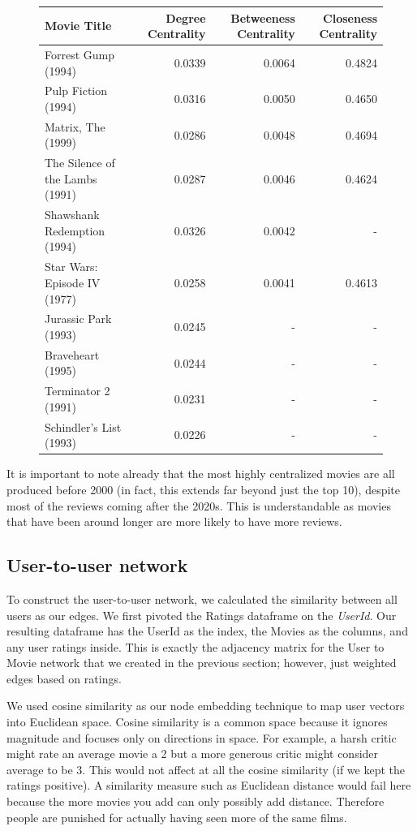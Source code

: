 \documentclass[12pt]{article}
\numberwithin{equation}{section}
\begin{document}
\begin{figure}[h!]
    \begin{tabular}{|p{6cm}|r|r|r|}
        \hline
        \textbf{Movie Title} & \multicolumn{1}{p{2.5cm}|}{\textbf{Degree Centrality}} & \multicolumn{1}{p{3cm}|}{\textbf{Betweeness Centrality}} & \multicolumn{1}{p{3cm}|}{\textbf{Closeness Centrality}} \\
        \hline
        Forrest Gump (1994) & 0.0339 & 0.0064 & 0.4824 \\
        Pulp Fiction (1994) & 0.0316 & 0.0050 & 0.4650 \\
        Matrix, The (1999) & 0.0286 & 0.0048 & 0.4694 \\
        The Silence of the Lambs (1991) & 0.0287 & 0.0046 & 0.4624 \\
        Shawshank Redemption (1994) & 0.0326 & 0.0042 & - \\
        Star Wars: Episode IV (1977) & 0.0258 & 0.0041 & 0.4613 \\
        Jurassic Park (1993) & 0.0245 & - & - \\
        Braveheart (1995) & 0.0244 & - & - \\
        Terminator 2 (1991) & 0.0231 & - & - \\
        Schindler's List (1993) & 0.0226 & - & - \\
        \hline
    \end{tabular}
\end{figure}

It is important to note already that the most highly centralized movies are all produced before 2000 (in fact, this extends far beyond just the top 10), despite most of the reviews coming after the 2020s. This is understandable as movies that have been around longer are more likely to have more reviews.

\subsection{User-to-user network}

To construct the user-to-user network, we calculated the similarity between all users as our edges.  We first pivoted the Ratings dataframe on the \textit{UserId}. Our resulting dataframe has the UserId as the index, the Movies as the columns, and any user ratings inside. This is exactly the adjacency matrix for the User to Movie network that we created in the previous section; however, just weighted edges based on ratings.

We used cosine similarity as our node embedding technique to map user vectors into Euclidean space. Cosine similarity is a common space because it ignores magnitude and focuses only on directions in space. For example, a harsh critic might rate an average movie a 2 but a more generous critic might consider average to be 3. This would not affect at all the cosine similarity (if we kept the ratings positive). A similarity measure such as Euclidean distance would fail here because the more movies you add can only possibly add distance. Therefore people are punished for actually having seen more of the same films.
\end{document}
